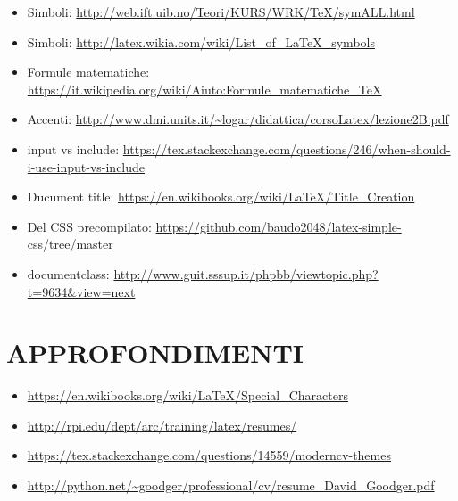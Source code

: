 \begin{itemize}
 \item Simboli: \url{http://web.ift.uib.no/Teori/KURS/WRK/TeX/symALL.html}
 \item Simboli: \url{http://latex.wikia.com/wiki/List_of_LaTeX_symbols}
 \item Formule matematiche: \url{https://it.wikipedia.org/wiki/Aiuto:Formule_matematiche_TeX}
 \item Accenti: \url{http://www.dmi.units.it/~logar/didattica/corsoLatex/lezione2B.pdf}
 \item input vs include: \url{https://tex.stackexchange.com/questions/246/when-should-i-use-input-vs-include}
 \item Ducument title: \url{https://en.wikibooks.org/wiki/LaTeX/Title_Creation}
 \item Del CSS precompilato: \url{https://github.com/baudo2048/latex-simple-css/tree/master}
 \item documentclass: \url{http://www.guit.sssup.it/phpbb/viewtopic.php?t=9634&view=next}
\end{itemize}


\section{APPROFONDIMENTI}
\begin{itemize}
 \item \url{https://en.wikibooks.org/wiki/LaTeX/Special_Characters}
 \item \url{http://rpi.edu/dept/arc/training/latex/resumes/}
 \item \url{https://tex.stackexchange.com/questions/14559/moderncv-themes}
 \item \url{http://python.net/~goodger/professional/cv/resume_David_Goodger.pdf}
\end{itemize}

